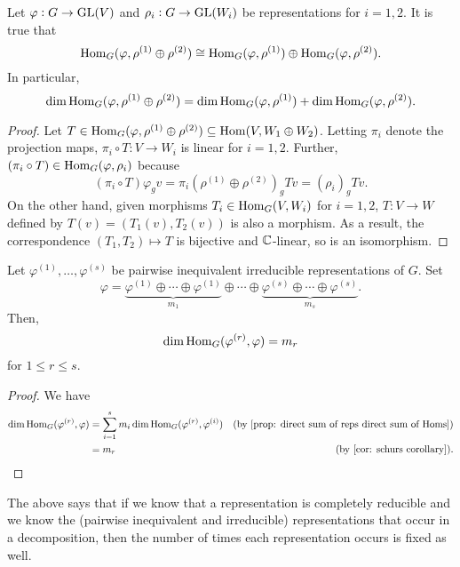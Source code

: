		\begin{fprop}
			\label{prop: direct sum of reps direct sum of Homs}
			Let $\varphi : G \to \operatorname{GL}(V)$ and $\rho_i : G \to \operatorname{GL}(W_i)$ be representations for $i = 1,2$. It is true that
			\[ \operatorname{Hom}_G(\varphi,\rho^{(1)} \oplus \rho^{(2)}) \cong \operatorname{Hom}_G(\varphi,\rho^{(1)}) \oplus \operatorname{Hom}_G(\varphi,\rho^{(2)}). \]
			In particular,
			\[ \dim \operatorname{Hom}_G(\varphi,\rho^{(1)} \oplus \rho^{(2)}) = \dim \operatorname{Hom}_G(\varphi,\rho^{(1)}) + \dim \operatorname{Hom}_G(\varphi,\rho^{(2)}). \]
		\end{fprop}
		\begin{proof}
			Let $T \in \operatorname{Hom}_G(\varphi,\rho^{(1)}\oplus\rho^{(2)}) \subseteq \operatorname{Hom}(V,W_1\oplus W_2)$. Letting $\pi_i$ denote the projection maps, $\pi_i \circ T : V \to W_i$ is linear for $i = 1,2$. Further, $(\pi_i \circ T) \in \operatorname{Hom}_G(\varphi,\rho_i)$ because
			\[ (\pi_i \circ T) \varphi_g v = \pi_i (\rho^{(1)} \oplus \rho^{(2)})_g T v = (\rho_i)_g T v. \]
			On the other hand, given morphisms $T_i \in \operatorname{Hom}_G(V,W_i)$ for $i = 1,2$, $T : V \to W$ defined by $T(v) = (T_1(v), T_2(v))$ is also a morphism. As a result, the correspondence $(T_1,T_2) \mapsto T$ is bijective and $\mathbb{C}$-linear, so is an isomorphism.
		\end{proof}

		\begin{fcor}
			Let $\varphi^{(1)},\ldots,\varphi^{(s)}$ be pairwise inequivalent irreducible representations of $G$. Set
			\[ \varphi = \underbrace{\varphi^{(1)} \oplus \cdots \oplus \varphi^{(1)}}_{m_1} \oplus \cdots \oplus \underbrace{\varphi^{(s)} \oplus \cdots \oplus \varphi^{(s)}}_{m_s}. \]
			Then,
			\[ \dim \operatorname{Hom}_G (\varphi^{(r)}, \varphi) = m_r \]
			for $1 \le r \le s$.
		\end{fcor}
		\begin{proof}
			We have
			\begin{align*}
				\dim \Hom_G (\varphi^{(r)}, \varphi) &= \sum_{i=1}^s m_i \dim \Hom_G (\varphi^{(r)},\varphi^{(i)}) & \text{(by \Cref{prop: direct sum of reps direct sum of Homs})} \\
					&= m_r & \text{(by \Cref{cor: schurs corollary})}. \qedhere
			\end{align*}
		\end{proof}

		The above says that if we know that a representation is completely reducible and we know the (pairwise inequivalent and irreducible) representations that occur in a decomposition, then the number of times each representation occurs is fixed as well.

